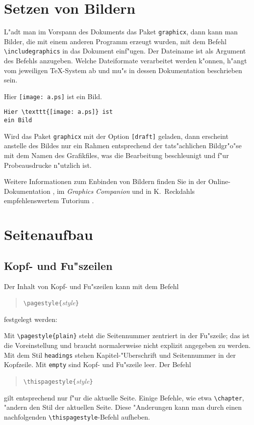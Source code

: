 
\section{Setzen von Bildern} \label{graphics}
L"adt man im Vorspann des Dokuments das Paket \texttt{graphicx},
dann kann man Bilder, die mit einem anderen Programm erzeugt wurden, 
mit dem Befehl \verb|\includegraphics| in das Dokument einf"ugen.
Der Dateiname ist als Argument des Befehls anzugeben.
Welche Dateiformate verarbeitet werden k"onnen, h"angt vom jeweiligen
\TeX-System ab und mu"s in dessen Dokumentation beschrieben sein.

\exa
Hier \texttt{[image: a.ps]} ist ein Bild.
\exb
\begin{verbatim}
Hier \texttt{[image: a.ps]} ist
ein Bild
\end{verbatim}
\exc
Wird das Paket \texttt{graphicx} mit der Option \texttt{[draft]} geladen,
dann erscheint anstelle des Bildes nur ein Rahmen entsprechend
der tats"achlichen Bildgr"o"se mit dem Namen des Grafikfiles, 
was die Bearbeitung beschleunigt und f"ur Probeausdrucke n"utzlich ist.

Weitere Informationen zum Enbinden von Bildern finden Sie in der 
Online-Dokumentation \cite{grfguide}, im \textit{Graphics Companion}
\cite{grfcomp} und in K.~Reckdahls empfehlenswertem  Tutorium \cite{epslatex}.



\section{Seitenaufbau}

\subsection{Kopf- und Fu"szeilen} 
Der Inhalt von Kopf- und  Fu"szeilen kann mit dem Befehl
\begin{verse}
\verb|\pagestyle{|\textit{style}\verb|}|
\end{verse}
festgelegt werden:
 
Mit \verb|\pagestyle{plain}| steht
die Seitennummer zentriert in der Fu"szeile; 
das ist die Voreinstellung und braucht normalerweise nicht explizit 
angegeben zu werden.
Mit dem Stil \texttt{headings} stehen Kapitel-"Uberschrift und
Seitennummer in der Kopfzeile.
Mit \texttt{empty} sind Kopf- und Fu"szeile leer.  Der Befehl
\begin{verse}
\verb|\thispagestyle{|\textit{style}\verb|}|
\end{verse}
gilt entsprechend nur f"ur die aktuelle Seite.  Einige Befehle, wie etwa
\verb|\chapter|, "andern den Stil der aktuellen Seite.  Diese "Anderungen 
kann man durch einen nachfolgenden \verb|\thispagestyle|-Befehl aufheben.


